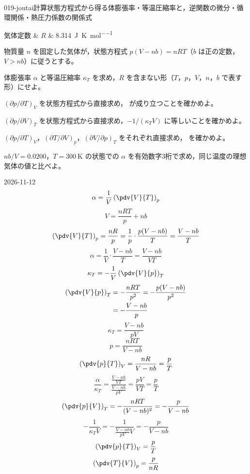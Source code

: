 \documentclass[uplatex,dvipdfmx,a4paper,11pt]{jsarticle}
\begin{document}
\begin{mondai}{019-joutai}{計算}{状態方程式から得る体膨張率・等温圧縮率と，逆関数の微分・循環関係・熱圧力係数の関係式}
\begin{teisuu}
  気体定数 & $R$ & \qty{8.314}{\joule\per\kelvin\per\mole}\\
\end{teisuu}
物質量 $n$ を固定した気体が，状態方程式 $p(V - nb) = nRT$（$b$ は正の定数，$V > nb$）に従うとする。
  \begin{shoumon}
    \item 体膨張率 $\alpha$ と等温圧縮率 $\kappa_{T}$ を求め，$R$ を含まない形（$T$，$p$，$V$，$n$，$b$ で表す形）にせよ。
    \item $(\partial p/\partial T)_{V}$ を状態方程式から直接求め， が成り立つことを確かめよ。
    \item $(\partial p/\partial V)_{T}$ を状態方程式から直接求め，$-1/(\kappa_{T}V)$ に等しいことを確かめよ。
    \item $(\partial p/\partial T)_{V}$，$(\partial T/\partial V)_{p}$，$(\partial V/\partial p)_{T}$ をそれぞれ直接求め， を確かめよ。
    \item $nb/V = 0.0200$，$T = \qty{300}{\kelvin}$ の状態での $\alpha$ を有効数字3桁で求め，同じ温度の理想気体の値と比べよ。
  \end{shoumon}
\begin{kotaeutsushi}{2026-11-12}
\[ \alpha=\frac{1}{V}\left(\pdv{V}{T}\right)_{p} \]
\[ V=\frac{nRT}{p}+nb \]
\[ \left(\pdv{V}{T}\right)_{p}=\frac{nR}{p}=\frac{1}{p}\cdot\frac{p(V-nb)}{T}=\frac{V-nb}{T} \]
\[ \alpha=\frac{1}{V}\cdot\frac{V-nb}{T}=\frac{V-nb}{VT} \]
\[ \kappa_{T}=-\frac{1}{V}\left(\pdv{V}{p}\right)_{T} \]
\begin{align*}
\left(\pdv{V}{p}\right)_{T}&=-\frac{nRT}{p^{2}}=-\frac{p(V-nb)}{p^{2}}\\
&=-\frac{V-nb}{p}
\end{align*}
\[ \kappa_{T}=\frac{V-nb}{pV} \]
\[ p=\frac{nRT}{V-nb} \]
\[ \left(\pdv{p}{T}\right)_{V}=\frac{nR}{V-nb}=\frac{p}{T} \]
\[ \frac{\alpha}{\kappa_{T}}=\frac{\frac{V-nb}{VT}}{\frac{V-nb}{pV}}=\frac{pV}{VT}=\frac{p}{T} \]
\[ \left(\pdv{p}{V}\right)_{T}=-\frac{nRT}{(V-nb)^{2}}=-\frac{p}{V-nb} \]
\[ -\frac{1}{\kappa_{T}V}=-\frac{1}{\frac{V-nb}{pV}V}=-\frac{p}{V-nb} \]
\[ \left(\pdv{p}{T}\right)_{V}=\frac{p}{T} \]
\[ \left(\pdv{T}{V}\right)_{p}=\frac{p}{nR} \]

\end{kotaeutsushi}
\end{mondai}
\end{document}
